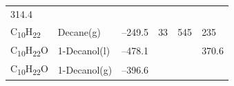 \documentclass[
  9pt,
]{extbook}
\theoremstyle{definition}
\theoremstyle{definition}
\theoremstyle{definition}
\theoremstyle{remark}
\begin{document}
\begin{longtable}[]{@{}llllll@{}}
\begin{minipage}[t]{0.14\columnwidth}
314.4\strut
\end{minipage}\tabularnewline
\begin{minipage}[t]{0.07\columnwidth}\raggedright
C\textsubscript{10}H\textsubscript{22}\strut
\end{minipage} & \begin{minipage}[t]{0.17\columnwidth}\raggedright
Decane(g)\strut
\end{minipage} & \begin{minipage}[t]{0.15\columnwidth}\raggedright
--249.5\strut
\end{minipage} & \begin{minipage}[t]{0.15\columnwidth}\raggedright
33\strut
\end{minipage} & \begin{minipage}[t]{0.14\columnwidth}\raggedright
545\strut
\end{minipage} & \begin{minipage}[t]{0.14\columnwidth}\raggedright
235\strut
\end{minipage}\tabularnewline
\begin{minipage}[t]{0.07\columnwidth}\raggedright
C\textsubscript{10}H\textsubscript{22}O\strut
\end{minipage} & \begin{minipage}[t]{0.17\columnwidth}\raggedright
1-Decanol(l)\strut
\end{minipage} & \begin{minipage}[t]{0.15\columnwidth}\raggedright
--478.1\strut
\end{minipage} & \begin{minipage}[t]{0.15\columnwidth}\raggedright
\strut
\end{minipage} & \begin{minipage}[t]{0.14\columnwidth}\raggedright
\strut
\end{minipage} & \begin{minipage}[t]{0.14\columnwidth}\raggedright
370.6\strut
\end{minipage}\tabularnewline
\begin{minipage}[t]{0.07\columnwidth}\raggedright
C\textsubscript{10}H\textsubscript{22}O\strut
\end{minipage} & \begin{minipage}[t]{0.17\columnwidth}\raggedright
1-Decanol(g)\strut
\end{minipage} & \begin{minipage}[t]{0.15\columnwidth}\raggedright
--396.6\strut
\end{minipage} & \begin{minipage}[t]{0.15\columnwidth}\raggedright

\end{minipage}
\end{longtable}
\end{document}
